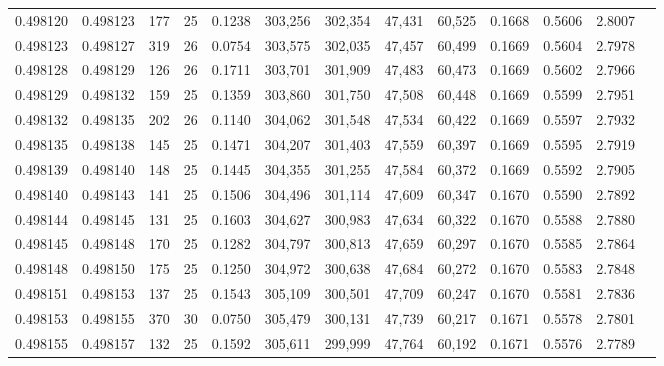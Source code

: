 \begin{tabular}{rrrrrrrrrrrrr}
0.498120 & 0.498123 & 177 &  25 &                                     0.1238 & 303,256 & 302,354 &  47,431 &  60,525 & 0.1668 & 0.5606 & 2.8007 \\
0.498123 & 0.498127 & 319 &  26 &                                     0.0754 & 303,575 & 302,035 &  47,457 &  60,499 & 0.1669 & 0.5604 & 2.7978 \\
0.498128 & 0.498129 & 126 &  26 &                                     0.1711 & 303,701 & 301,909 &  47,483 &  60,473 & 0.1669 & 0.5602 & 2.7966 \\
0.498129 & 0.498132 & 159 &  25 &                                     0.1359 & 303,860 & 301,750 &  47,508 &  60,448 & 0.1669 & 0.5599 & 2.7951 \\
0.498132 & 0.498135 & 202 &  26 &                                     0.1140 & 304,062 & 301,548 &  47,534 &  60,422 & 0.1669 & 0.5597 & 2.7932 \\
0.498135 & 0.498138 & 145 &  25 &                                     0.1471 & 304,207 & 301,403 &  47,559 &  60,397 & 0.1669 & 0.5595 & 2.7919 \\
0.498139 & 0.498140 & 148 &  25 &                                     0.1445 & 304,355 & 301,255 &  47,584 &  60,372 & 0.1669 & 0.5592 & 2.7905 \\
0.498140 & 0.498143 & 141 &  25 &                                     0.1506 & 304,496 & 301,114 &  47,609 &  60,347 & 0.1670 & 0.5590 & 2.7892 \\
0.498144 & 0.498145 & 131 &  25 &                                     0.1603 & 304,627 & 300,983 &  47,634 &  60,322 & 0.1670 & 0.5588 & 2.7880 \\
0.498145 & 0.498148 & 170 &  25 &                                     0.1282 & 304,797 & 300,813 &  47,659 &  60,297 & 0.1670 & 0.5585 & 2.7864 \\
0.498148 & 0.498150 & 175 &  25 &                                     0.1250 & 304,972 & 300,638 &  47,684 &  60,272 & 0.1670 & 0.5583 & 2.7848 \\
0.498151 & 0.498153 & 137 &  25 &                                     0.1543 & 305,109 & 300,501 &  47,709 &  60,247 & 0.1670 & 0.5581 & 2.7836 \\
0.498153 & 0.498155 & 370 &  30 &                                     0.0750 & 305,479 & 300,131 &  47,739 &  60,217 & 0.1671 & 0.5578 & 2.7801 \\
0.498155 & 0.498157 & 132 &  25 &                                     0.1592 & 305,611 & 299,999 &  47,764 &  60,192 & 0.1671 & 0.5576 & 2.7789 \\

\end{tabular}
